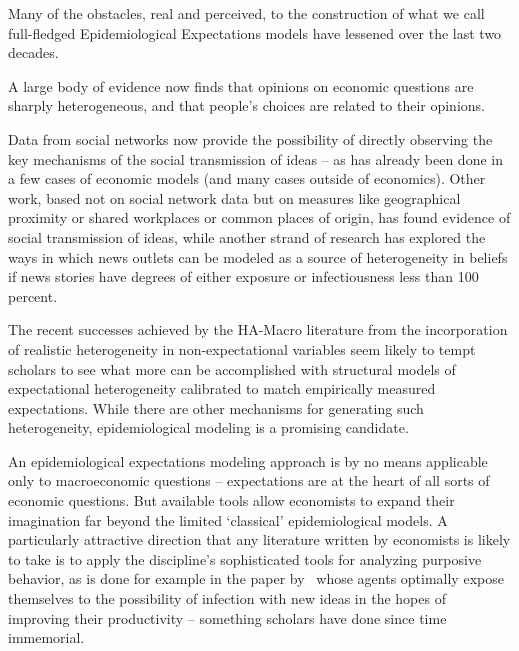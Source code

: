 
\label{conclusion}%

Many of the obstacles, real and perceived, to the construction of what we call full-fledged Epidemiological Expectations models have lessened over the last two decades.

A large body of evidence now finds that opinions on economic questions are sharply heterogeneous, and that people's choices are related to their opinions.

Data from social networks now provide the possibility of directly observing the key mechanisms of the social transmission of ideas -- as  has already been done in a few cases of economic models (and many cases outside of economics).  Other work, based not on social network data but on measures like geographical proximity or shared workplaces or common places of origin, has found evidence of social transmission of ideas, while another strand of research has explored the ways in which news outlets can be modeled as a source of heterogeneity in beliefs if news stories have degrees of either exposure or infectiousness less than 100 percent.

The recent successes achieved by the HA-Macro literature from the incorporation of realistic heterogeneity in non-expectational variables seem likely to tempt scholars to see what more can be accomplished with structural models of expectational heterogeneity calibrated to match empirically measured expectations.  While there are other mechanisms for generating such heterogeneity, epidemiological modeling is a promising candidate.

An epidemiological expectations modeling approach is by no means applicable only to macroeconomic questions -- expectations are at the heart of all sorts of economic questions.  But available tools allow economists to expand their imagination far beyond the limited `classical' epidemiological models.  A particularly attractive direction that any literature written by economists is likely to take is to apply the discipline's sophisticated tools for analyzing purposive behavior, as is done for example in the paper by~\cite{lucas2014knowledge} whose agents optimally expose themselves to the possibility of infection with new ideas in the hopes of improving their productivity -- something scholars have done since time immemorial.


